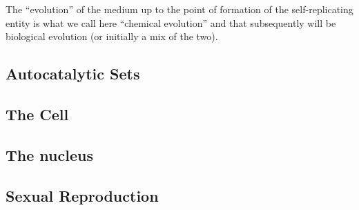 The ``evolution'' of the medium up to the point of formation of the self-replicating entity is what we call here ``chemical evolution'' and that subsequently will be biological evolution (or initially a mix of the two).

\subsection{Autocatalytic Sets}


\subsection{The Cell}


\subsection{The nucleus}


\subsection{Sexual Reproduction}
